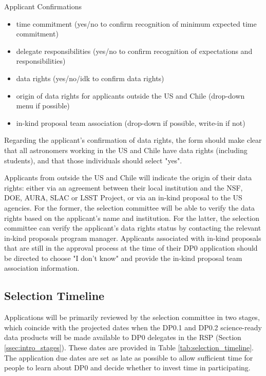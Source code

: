 \documentclass[DM,lsstdraft,authoryear,toc]{lsstdoc}
\begin{document}
Applicant Confirmations
\begin{itemize}
\item time commitment (yes/no to confirm recognition of minimum expected time commitment)
\item delegate responsibilities (yes/no to confirm recognition of expectations and responsibilities)
\item data rights (yes/no/idk to confirm data rights)
\item origin of data rights for applicants outside the US and Chile (drop-down menu if possible)
\item in-kind proposal team association (drop-down if possible, write-in if not)
\end{itemize}

Regarding the applicant's confirmation of data rights, the form should make clear that all astronomers working in the US and Chile have data rights (including students), and that those individuals should select "yes".

Applicants from outside the US and Chile will indicate the origin of their data rights: either via an agreement between their local institution and the NSF, DOE, AURA, SLAC or LSST Project, or via an in-kind proposal to the US agencies. 
For the former, the selection committee will be able to verify the data rights based on the applicant's name and institution.
For the latter, the selection committee can verify the applicant's data rights status by contacting the relevant in-kind proposals program manager.
Applicants associated with in-kind proposals that are still in the approval process at the time of their DP0 application should be directed to choose "I don't know" and provide the in-kind proposal team association information. 

\subsection{Selection Timeline}\label{ssec:sel_time}

Applications will be primarily reviewed by the selection committee in two stages, which coincide with the projected dates when the DP0.1 and DP0.2 science-ready data products will be made available to DP0 delegates in the RSP (Section \ref{ssec:intro_stages}).
These dates are provided in Table \ref{tab:selection_timeline}.
The application due dates are set as late as possible to allow sufficient time for people to learn about DP0 and decide whether to invest time in participating.
\end{document}
